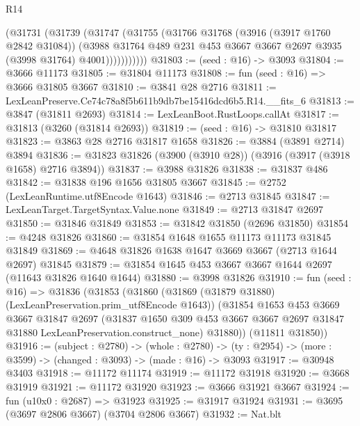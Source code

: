 \begin{lexlean}{R14}
\begin{coremodule}
              (@31731
                (@31739
                  (@31747
                    (@31755
                      (@31766
                        @31768
                        (@3916 (@3917 @1760 @2842 @31084))
                        (@3988
                          @31764
                          @489
                          @231
                          @453
                          @3667
                          @3667
                          @2697
                          @3935
                          (@3998 @31764)
                          @4001)))))))))))
@31803 := (seed : @16) -> @3093
@31804 := @3666 @11173
@31805 := @31804 @11173
@31808 := fun (seed : @16) => @3666 @31805 @3667
@31810 := @3841 @28 @2716
@31811 := LexLeanPreserve.Ce74c78a8f5b611b9db7be15416dcd6b5.R14.__fits_6
@31813 := @3847 (@31811 @2693)
@31814 := LexLeanBoot.RustLoops.callAt
@31817 := @31813 (@3260 (@31814 @2693))
@31819 := (seed : @16) -> @31810 @31817
@31823 := @3863 @28 @2716 @31817 @1658
@31826 := @3884 (@3891 @2714) @3894
@31836 := @31823 @31826 (@3900 (@3910 @28)) (@3916 (@3917 (@3918 @1658) @2716 @3894))
@31837 := @3988 @31826
@31838 := @31837 @486
@31842 := @31838 @196 @1656 @31805 @3667
@31845 := @2752 (LexLeanRuntime.utf8Encode @1643)
@31846 := @2713 @31845
@31847 := LexLeanTarget.TargetSyntax.Value.none
@31849 := @2713 @31847 @2697
@31850 := @31846 @31849
@31853 := @31842 @31850 (@2696 @31850)
@31854 := @4248 @31826
@31860 := @31854 @1648 @1655 @11173 @11173 @31845 @31849
@31869 := @4648 @31826 @1638 @1647 @3669 @3667 (@2713 @1644 @2697) @31845
@31879 := @31854 @1645 @453 @3667 @3667 @1644 @2697 (@11643 @31826 @1640 @1644)
@31880 := @3998 @31826
@31910 := fun (seed : @16) =>
  @31836
    (@31853
      (@31860
        (@31869 (@31879 @31880) (LexLeanPreservation.prim_utf8Encode @1643))
        (@31854
          @1653
          @453
          @3669
          @3667
          @31847
          @2697
          (@31837
            @1650
            @309
            @453
            @3667
            @3667
            @2697
            @31847
            @31880
            LexLeanPreservation.construct_none)
          @31880))
      (@11811 @31850))
@31916 := (subject : @2780) ->
  (whole : @2780) -> (ty : @2954) -> (more : @3599) -> (changed : @3093) -> (made : @16) -> @3093
@31917 := @30948 @3403
@31918 := @11172 @11174
@31919 := @11172 @31918
@31920 := @3668 @31919
@31921 := @11172 @31920
@31923 := @3666 @31921 @3667
@31924 := fun (u10x0 : @2687) => @31923
@31925 := @31917 @31924
@31931 := @3695 (@3697 @2806 @3667) (@3704 @2806 @3667)
@31932 := Nat.blt

\end{coremodule}
\end{lexlean}
